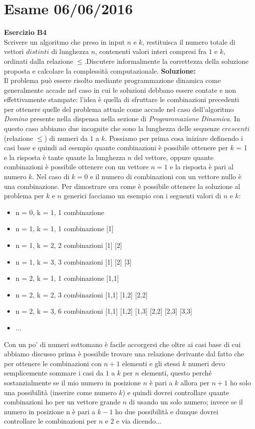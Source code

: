 \documentclass[../cheatSheetAlgoritmi.tex]{subfiles}
\begin{document}
\section{Esame 06/06/2016}
\textbf{Esercizio B4}\\
Scrivere un algoritmo che preso in input $n$ e $k$, restituisca il numero totale di vettori $distinti$ di lunghezza $n$, contenenti valori interi compresi fra $1$ e $k$, ordinati dalla relazione $\leq$.Discutere informalmente la correttezza della soluzione proposta e calcolare la complessità computazionale.
\textbf{Soluzione:}\\
Il problema può essere risolto mediante programmazione dinamica come generalmente accade nel caso in cui le soluzioni debbano essere contate e non effettivamente stampate: l'idea è quella di sfruttare le combinazioni precedenti per ottenere quelle del problema attuale come accade nel caso dell'algoritmo \emph{Domino} presente nella dispensa nella sezione di \emph{Programmazione Dinamica}. In questo caso abbiamo due incognite che sono la lunghezza delle sequenze $crescenti$ (relazione $\leq$) di numeri da $1$ a $k$. Possiamo per prima cosa iniziare definendo i casi base e quindi ad esempio quante combinazioni è possibile ottenere per $k$ = 1 e la risposta è tante quante la lunghezza $n$ del vettore, oppure quante combinazioni è possibile ottenere con un vettore $n = 1$ e la risposta è pari al numero $k$. Nel caso di $k = 0$ e il numero di combinazioni con un vettore nullo è una combinazione. Per dimostrare ora come è possibile ottenere la soluzione al problema per $k$ e $n$ generici facciamo un esempio con i seguenti valori di $n$ e $k$:
\begin{itemize}
	\item n = 0, k = 1, 1 combinazione
	\item n = 1, k = 1, 1 combinazione 		[1]
	\item n = 1, k = 2, 2 combinazioni 		[1] [2]
	\item n = 1, k = 3, 3 combinazioni		[1] [2] [3]
	\item n = 2, k = 1, 1 combinazione		[1,1]
	\item n = 2, k = 2, 3 combinazioni		[1,1] [1,2] [2,2]
	\item n = 2, k = 3, 6 combinazioni		[1,1] [1,2] [1,3] [2,2] [2,3] [3,3]
	\item ...
\end{itemize}
Con un po' di numeri sottomano è facile accorgersi che oltre ai casi base di cui abbiamo discusso prima è possibile trovare una relazione derivante dal fatto che per ottenere le combinazioni con $n+1$ elementi e gli stessi $k$ numeri devo semplicemente sommare i casi da $1$ a $k$ per $n$ elementi, questo perché sostanzialmente se il mio numero in posizione $n$ è pari a $k$ allora per $n+1$ ho solo una possibilità (inserire come numero $k$) e quindi dovrei controllare quante combinazioni ho per un vettore grande $n$ di usando un solo numero; invece se il numero in posizione n è pari a $k-1$ ho due possibilità e dunque dovrei controllare le combinazioni per $n$ e $2$ e via dicendo...
\end{document}
